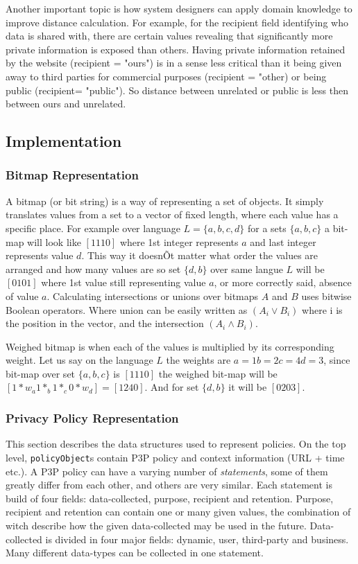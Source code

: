 Another important topic is how system designers can apply domain knowledge to improve distance calculation. For example, for the recipient field identifying who data is shared with, there are certain values revealing that significantly more private information is exposed than others. Having private information retained by the website (recipient = "ours") is in a sense less critical than it being given away to third parties for commercial purposes (recipient = "other) or being public (recipient= "public"). So distance between unrelated or public is less then between ours and unrelated.

\subsection{Implementation}

\subsubsection{Bitmap Representation}
A bitmap (or bit string) is a way of representing a set of objects. It simply translates values from a set to a vector of fixed length, where each value has a specific place. For example over language $L=\{a,b,c,d\}$ for a sets $\{a,b,c\}$ a bit-map will look like $[1 1 1 0]$ where 1st integer represents $a$ and last integer represents value $d$. This way it doesnÕt matter what order the values are arranged and how many values are so set $\{d,b\}$ over same langue $L$ will be $[0 1 0 1]$ where 1st value still representing value $a$, or more correctly said, absence of value $a$. Calculating intersections or unions over bitmaps $A$ and $B$ uses bitwise Boolean operators. Where union can be easily written as $(A_i \vee B_i)$ where i is the position in the vector, and the intersection $(A_i \wedge B_i)$.

Weighed bitmap is when each of the values is multiplied by its corresponding weight. Let us say on the language $L$ the weights are $a=1 b=2 c=4 d=3$, since bit-map over set $\{a,b,c\}$ is $[1 1 1 0]$ the weighed bit-map will be $[1*w_a 1*_b 1*_c 0*w_d]=[1 2 4 0]$. And for set $\{d,b\}$ it will be $[0 2 0 3]$.

\subsubsection{Privacy Policy Representation}

This section describes the data structures used to represent policies. On the top level, \texttt{policyObject}s contain P3P policy and context information (URL + time etc.). A P3P policy can have a varying number of \emph{statements}, some of them greatly differ from each other, and others are very similar. Each statement is build of four fields: data-collected, purpose, recipient and retention. Purpose, recipient and retention can contain one or many given values, the combination of witch describe how the given data-collected may be used in the future. Data-collected is divided in four major fields: dynamic, user, third-party and business. Many different data-types can be collected in one statement.

